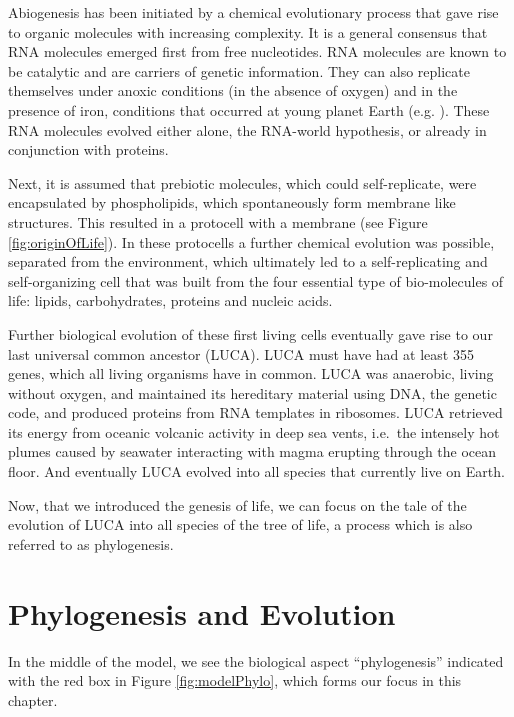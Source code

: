 \documentclass[
  11pt,
]{book}
\begin{document}
Abiogenesis has been initiated by a chemical evolutionary process that gave rise to organic molecules with increasing complexity. It is a general consensus that RNA molecules emerged first from free nucleotides. RNA molecules are known to be catalytic and are carriers of genetic information. They can also replicate themselves under anoxic conditions (in the absence of oxygen) and in the presence of iron, conditions that occurred at young planet Earth (e.g. \citet{Williams2013}). These RNA molecules evolved either alone, the RNA-world hypothesis, or already in conjunction with proteins.

Next, it is assumed that prebiotic molecules, which could self-replicate, were encapsulated by phospholipids, which spontaneously form membrane like structures. This resulted in a protocell with a membrane (see Figure \ref{fig:originOfLife}).
In these protocells a further chemical evolution was possible, separated from the environment, which ultimately led to a self-replicating and self-organizing cell that was built from the four essential type of bio-molecules of life: lipids, carbohydrates, proteins and nucleic acids.

Further biological evolution of these first living cells eventually gave rise to our last universal common ancestor (LUCA).
LUCA must have had at least 355 genes, which all living organisms have in common.
LUCA was anaerobic, living without oxygen, and maintained its hereditary material using DNA, the genetic code, and produced proteins from RNA templates in ribosomes. LUCA retrieved its energy from oceanic volcanic activity in deep sea vents, i.e.~the intensely hot plumes caused by seawater interacting with magma erupting through the ocean floor. And eventually LUCA evolved into all species that currently live on Earth.

Now, that we introduced the genesis of life, we can focus on the tale of the evolution of LUCA into all species of the tree of life, a process which is also referred to as phylogenesis.

\hypertarget{phylogenesis-and-evolution}{%
\chapter{Phylogenesis and Evolution}\label{phylogenesis-and-evolution}}

In the middle of the model, we see the biological aspect ``phylogenesis'' indicated with the red box in Figure \ref{fig:modelPhylo}, which forms our focus in this chapter.
\end{document}

